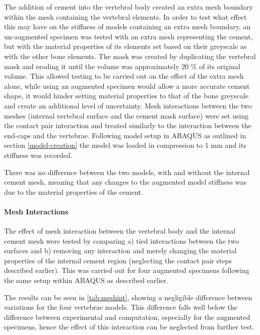 The addition of cement into the vertebral body created an extra mesh boundary
within the mesh containing the vertebral elements. In order to test what
effect this may have on the stiffness of models containing an extra
mesh boundary, an un-augmented specimen was tested with an extra mesh
representing the cement, but with the material properties of its
elements set based on their greyscale as with the other bone elements.
The mask was created by duplicating the vertebral mask and eroding it
until the volume was approximately 20 \% of its original volume. This
allowed testing to be carried out on the effect of the extra mesh alone,
while using an augmented specimen would allow a more accurate cement
shape, it would hinder setting material properties to that of the bone
greyscale and create an additional level of uncertainty. Mesh
interactions between the two meshes (internal vertebral surface and the
cement mask surface) were set using the contact pair interaction and
treated similarly to the interaction between the end-caps and the
vertebrae. Following model setup in ABAQUS as outlined in section \ref{model-creation} the model
was loaded in compression to 1 mm and its stiffness was recorded.

There was no difference between the two models, with and without the
internal cement mesh, meaning that any changes to the augmented model
stiffness was due to the material properties of the cement.

\paragraph{Mesh Interactions}\label{mesh-interactions}

The effect of mesh interaction between the vertebral body and the
internal cement mesh were tested by comparing a) tied interactions
between the two surfaces and b) removing any interaction and merely
changing the material properties of the internal cement region
(neglecting the contact pair steps described earlier). This was carried
out for four augmented specimens following the same setup within ABAQUS
as described earlier.

The results can be seen in \cref{tab:meshint}, showing a negligible
difference
between variations for the four vertebrae models. This difference falls
well below the difference between experimental and computation,
especially for the augmented specimens, hence the effect of this
interaction can be neglected from further test.

